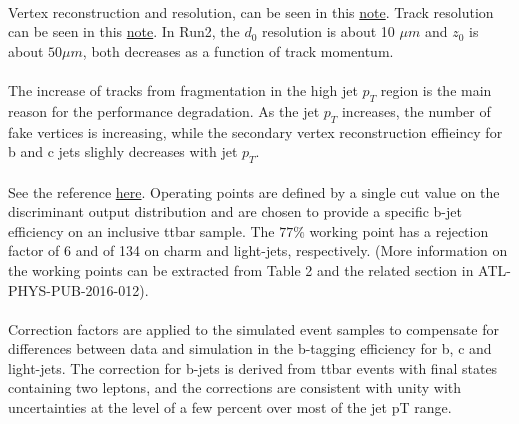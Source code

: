 \paragraph{}
Vertex reconstruction and resolution, can be seen in this \href{http://atlas.web.cern.ch/Atlas/GROUPS/PHYSICS/PUBNOTES/ATL-PHYS-PUB-2015-026/}{note}. Track resolution can be seen in this \href{https://cds.cern.ch/record/2110140/files/ATL-PHYS-PUB-2015-051.pdf}{note}. In Run2, the $d_0$ resolution is about 10 $\mu m$ and $z_0$ is about $50 \mu m$, both decreases as a function of track momentum.

\paragraph{}
The increase of tracks from fragmentation in the high jet $p_T$ region is the main reason for the performance degradation. As the jet $p_T$ increases, the number of fake vertices is increasing, while the secondary vertex reconstruction effieincy for b and c jets slighly decreases with jet $p_T$.

\paragraph{}
See the reference \href{https://twiki.cern.ch/twiki/bin/viewauth/AtlasProtected/BTaggingPaperRecommendations}{here}. Operating points are defined by a single cut value on the discriminant output distribution and are chosen to provide a specific b-jet efficiency on an inclusive ttbar sample. The $77\%$ working point has a rejection factor of 6 and of 134 on charm and light-jets, respectively. (More information on the working points can be extracted from Table 2 and the related section in ATL-PHYS-PUB-2016-012).

\paragraph{}
Correction factors are applied to the simulated event samples to compensate for differences between data and simulation in the b-tagging efficiency for b, c and light-jets. The correction for b-jets is derived from ttbar events with final states containing two leptons, and the corrections are consistent with unity with uncertainties at the level of a few percent over most of the jet pT range.

